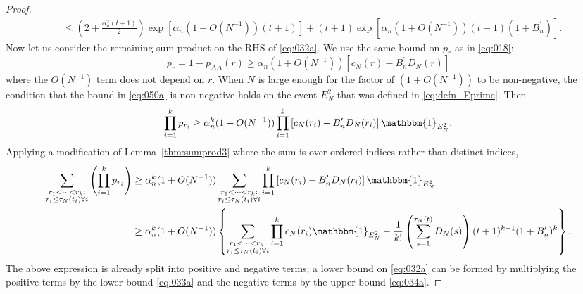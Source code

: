 \documentclass{article}
\newcommand{\1}[1]{\mathbbm{1}_{#1}}
\begin{document}
\begin{proof}
\begin{align}
&\leq \left( 2 + \frac{\alpha_n^2 (t+1)}{2} \right) 
        \exp[ \alpha_n (1+O(N^{-1})) (t+1) ] 
        + (t+1) \exp[ \alpha_n (1+O(N^{-1})) (t+1) (1+B_n^\prime) ] .
        \label{eq:034a}
\end{align}
Now let us consider the remaining sum-product on the RHS of \eqref{eq:032a}.
We use the same bound on $p_r$ as in \eqref{eq:018}:
\begin{equation}\label{eq:050a}
p_r
= 1 -p_{\Delta\Delta}(r) 
\geq \alpha_n (1+O(N^{-1})) 
        \left[ c_N(r) - B_n^\prime D_N(r) \right] 
\end{equation}
where the $O(N^{-1})$ term does not depend on $r$.
When $N$ is large enough for the factor of $(1+O(N^{-1}))$ to be non-negative, the condition that the bound in \eqref{eq:050a} is non-negative holds on the event $E_N^2$ that was defined in \eqref{eq:defn_Eprime}.
Then
\begin{equation}
\prod_{i=1}^k p_{r_i}
\geq \alpha_n^k (1+O(N^{-1})) 
        \prod_{i=1}^k \left[ c_N(r_i) - B_n^\prime D_N(r_i) \right] \1{E_N^2} .
\end{equation}
Applying a modification of Lemma~\ref{thm:sumprod3} where the sum is over ordered indices rather than distinct indices,
\begin{align}
\sum_{\substack{r_1 <\dots< r_k :\\ r_i \leq \tau_N(t_i) \forall i}}
        \left( \prod_{i=1}^k p_{r_i} \right)
&\geq \alpha_n^k (1+O(N^{-1})) \sum_{\substack{r_1 <\dots< r_k 
        :\\ r_i \leq \tau_N(t_i) \forall i}} \prod_{i=1}^k
        \left[ c_N(r_i) - B_n^\prime D_N(r_i) \right] \1{E_N^2} \notag\\
&\geq \alpha_n^k (1+O(N^{-1})) \left\{
        \sum_{\substack{r_1 <\dots< r_k :\\ r_i \leq \tau_N(t_i) \forall i}}
        \prod_{i=1}^k c_N(r_i) \1{E_N^2}
        - \frac{1}{k!} \left( \sum_{s=1}^{\tau_N(t)} D_N(s) \right)
        (t+1)^{k-1} (1+B_n^\prime)^k \right\} .
\end{align}
The above expression is already split into positive and negative terms; a lower bound on \eqref{eq:032a} can be formed by multiplying the positive terms by the lower bound \eqref{eq:033a} and the negative terms by the upper bound \eqref{eq:034a}. 

\end{proof}
\end{document}
